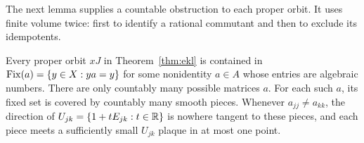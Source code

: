 The next lemma supplies a countable obstruction to each proper orbit.
It uses finite volume twice: first to identify a rational commutant and
then to exclude its idempotents.

\begin{lemma}\label{lem:fixed-pieces}
Every proper orbit $xJ$ in Theorem~\ref{thm:ekl} is contained in
$\operatorname{Fix}(a)=\{y\in X:ya=y\}$ for some nonidentity $a\in A$ whose entries
are algebraic numbers. There are only countably many possible matrices
$a$. For each such $a$, its fixed set is covered by countably many
smooth pieces. Whenever $a_{jj}\ne a_{kk}$, the direction of
$U_{jk}=\{1+tE_{jk}:t\in\mathbb R\}$ is nowhere tangent to these pieces,
and each piece meets a sufficiently small $U_{jk}$ plaque in at most
one point.
\end{lemma}


